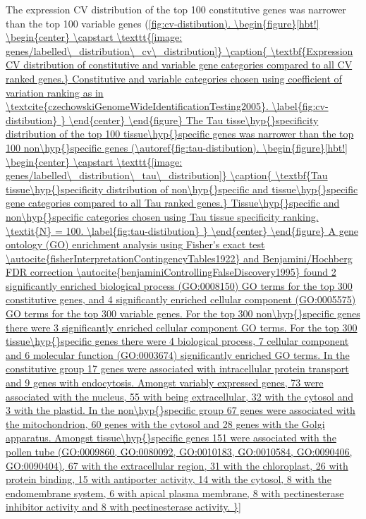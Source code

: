 \documentclass[../main.tex]{subfiles}
\begin{document}
The expression CV distribution of the top 100 constitutive genes was narrower than the top 100 variable genes (\autoref{fig:cv-distibution).

\begin{figure}[hbt!]
	\begin{center}
		\capstart
		\texttt{[image: genes/labelled\_distribution\_cv\_distribution]}
		\caption{
			\textbf{Expression CV distribution of constitutive and variable gene categories compared to all CV ranked genes.}			
			Constitutive and variable categories chosen using coefficient of variation ranking as in \textcite{czechowskiGenomeWideIdentificationTesting2005}.			
			\label{fig:cv-distibution}
		}
	\end{center}
\end{figure}

The Tau tisse\hyp{}specificity distribution of the top 100 tissue\hyp{}specific genes was narrower than the top 100 non\hyp{}specific genes (\autoref{fig:tau-distibution).


\begin{figure}[hbt!]
	\begin{center}
		\capstart
		\texttt{[image: genes/labelled\_distribution\_tau\_distribution]}
		\caption{
			\textbf{Tau tissue\hyp{}specificity distribution of non\hyp{}specific and tissue\hyp{}specific gene categories compared to all Tau ranked genes.}			
			Tissue\hyp{}specific and non\hyp{}specific categories chosen using Tau tissue specificity ranking. \textit{N} = 100.				
			\label{fig:tau-distibution}
		}
	\end{center}
\end{figure}

A gene ontology (GO) enrichment analysis using Fisher's exact test \autocite{fisherInterpretationContingencyTables1922} and Benjamini/Hochberg FDR correction \autocite{benjaminiControllingFalseDiscovery1995} found 2 significantly enriched biological process (GO:0008150) GO terms for the top 300 constitutive genes, and 4 significantly enriched cellular component (GO:0005575) GO terms for the top 300 variable genes. For the top 300 non\hyp{}specific genes there were 3 significantly enriched cellular component GO terms. For the top 300 tissue\hyp{}specific genes there were 4 biological process, 7 cellular component and 6 molecular function (GO:0003674) significantly enriched GO terms.
In the constitutive group 17 genes were associated with intracellular protein transport and 9 genes with endocytosis.
Amongst variably expressed genes, 73 were associated with the nucleus, 55 with being extracellular, 32 with the cytosol and 3 with the plastid.
In the non\hyp{}specific group 67 genes were associated with the mitochondrion, 60 genes with the cytosol and 28 genes with the Golgi apparatus.
Amongst tissue\hyp{}specific genes 151 were associated with the pollen tube (GO:0009860, GO:0080092, GO:0010183, GO:0010584, GO:0090406, GO:0090404), 67 with the extracellular region,  31 with the chloroplast, 26 with protein binding, 15 with antiporter activity, 14 with the cytosol, 8 with the endomembrane system, 6 with apical plasma membrane,  8 with pectinesterase inhibitor activity and 8 with pectinesterase activity.

}}
\end{document}
